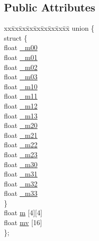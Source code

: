 \subsection*{Public Attributes}
\begin{DoxyCompactItemize}
\item 
\begin{tabbing}
xx\=xx\=xx\=xx\=xx\=xx\=xx\=xx\=xx\=\kill
union \{\\
\>struct \{\\
\>\>float \hyperlink{classh2_1_1_matrix4x4f_a5121665de42831399b3e5f5328f9218e}{\_m00}\\
\>\>float \hyperlink{classh2_1_1_matrix4x4f_a0ef9fa934da1bf15da717b56de41334c}{\_m01}\\
\>\>float \hyperlink{classh2_1_1_matrix4x4f_a4b248a3d617ad43fc36c5c91d31c35a3}{\_m02}\\
\>\>float \hyperlink{classh2_1_1_matrix4x4f_af9be57875aeb679dcc718f5e2af838c1}{\_m03}\\
\>\>float \hyperlink{classh2_1_1_matrix4x4f_aedefede7327866d61046151d8f9b0eb0}{\_m10}\\
\>\>float \hyperlink{classh2_1_1_matrix4x4f_a140f66bf07b5857881ba3a094ee008db}{\_m11}\\
\>\>float \hyperlink{classh2_1_1_matrix4x4f_a279f6f02edbdd7f62b920693f398ef9f}{\_m12}\\
\>\>float \hyperlink{classh2_1_1_matrix4x4f_a9b2d097560beaeaa2a1bbfbc89f6cac1}{\_m13}\\
\>\>float \hyperlink{classh2_1_1_matrix4x4f_aa82b53d10e7f16fae05855364d07b2eb}{\_m20}\\
\>\>float \hyperlink{classh2_1_1_matrix4x4f_ad44fa22dcc28750f515ad6adabbc5d70}{\_m21}\\
\>\>float \hyperlink{classh2_1_1_matrix4x4f_a3981f6ff58eb2222562a8b8dffe7f512}{\_m22}\\
\>\>float \hyperlink{classh2_1_1_matrix4x4f_abe26b63fed9bbb47dbbf13dc6f8f1914}{\_m23}\\
\>\>float \hyperlink{classh2_1_1_matrix4x4f_a84f503d2e971dc54a770a9a9a37912f4}{\_m30}\\
\>\>float \hyperlink{classh2_1_1_matrix4x4f_acdb501108e0d0aeb93695c85010ceb56}{\_m31}\\
\>\>float \hyperlink{classh2_1_1_matrix4x4f_a17c9aa5e7f6a55024fec49eb29093bc4}{\_m32}\\
\>\>float \hyperlink{classh2_1_1_matrix4x4f_a07e9a0772f8659cec76192eafcb2018c}{\_m33}\\
\>\} \\
\>float \hyperlink{classh2_1_1_matrix4x4f_af323c8a5b194faa2b5e443cdf6d56721}{m} \mbox{[}4\mbox{]}\mbox{[}4\mbox{]}\\
\>float \hyperlink{classh2_1_1_matrix4x4f_a4feb2ce3acca58b0e4f7210466d602fe}{mv} \mbox{[}16\mbox{]}\\
\}; \\

\end{tabbing}\end{DoxyCompactItemize}
